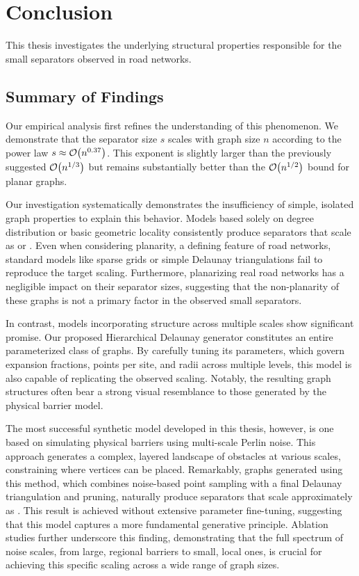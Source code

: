\chapter{Conclusion}
\label{ch:conclusion}

This thesis investigates the underlying structural properties responsible for the small separators observed in road networks.

\section{Summary of Findings}
\label{sec:conclusion:summary}

Our empirical analysis first refines the understanding of this phenomenon.
We demonstrate that the separator size \(s\) scales with graph size \(n\) according to the power law \(s \approx \mathcal{O}\!\left(n^{0.37}\right)\).
This exponent is slightly larger than the previously suggested \(\mathcal{O}\!\left(n^{1/3}\right)\) \cite{dibbelt_customizable_2016} but remains substantially better than the \(\mathcal{O}\!\left(n^{1/2}\right)\) bound for planar graphs.

Our investigation systematically demonstrates the insufficiency of simple, isolated graph properties to explain this behavior.
Models based solely on degree distribution or basic geometric locality consistently produce separators that scale as  or .
Even when considering planarity, a defining feature of road networks, standard models like sparse grids or simple Delaunay triangulations fail to reproduce the target scaling.
Furthermore, planarizing real road networks has a negligible impact on their separator sizes, suggesting that the non-planarity of these graphs is not a primary factor in the observed small separators.

In contrast, models incorporating structure across multiple scales show significant promise.
Our proposed Hierarchical Delaunay generator constitutes an entire parameterized class of graphs.
By carefully tuning its parameters, which govern expansion fractions, points per site, and radii across multiple levels, this model is also capable of replicating the observed  scaling.
Notably, the resulting graph structures often bear a strong visual resemblance to those generated by the physical barrier model.

The most successful synthetic model developed in this thesis, however, is one based on simulating physical barriers using multi-scale Perlin noise.
This approach generates a complex, layered landscape of obstacles at various scales, constraining where vertices can be placed.
Remarkably, graphs generated using this method, which combines noise-based point sampling with a final Delaunay triangulation and pruning, naturally produce separators that scale approximately as .
This result is achieved without extensive parameter fine-tuning, suggesting that this model captures a more fundamental generative principle.
Ablation studies further underscore this finding, demonstrating that the full spectrum of noise scales, from large, regional barriers to small, local ones, is crucial for achieving this specific scaling across a wide range of graph sizes.

